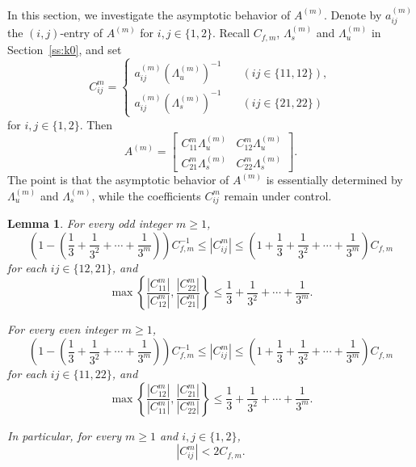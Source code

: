 \documentclass{amsart}
\theoremstyle{plain}
\newtheorem{lem}[thm]{Lemma}
\theoremstyle{definition}
\theoremstyle{remark}
\numberwithin{equation}{section}
\begin{document}
In this section, we investigate the asymptotic behavior of $A^{(m)}$.
Denote by $a_{ij}^{(m)}$ the $(i,j)$-entry of $A^{(m)}$ for $i,j\in\{1,2\}$.
Recall $C_{f,m}$, $\Lambda_{s}^{(m)}$ and $\Lambda_{u}^{(m)}$ in Section~\ref{ss:k0}, and set
\[
C_{ij}^m=
\begin{cases}
a^{(m)}_{ij}(\Lambda_{u}^{(m)})^{-1} \quad &(\text{$ij\in \{11,12\}$}),\\[2mm]
a^{(m)}_{ij}(\Lambda_{s}^{(m)})^{-1} \quad &(\text{$ij\in \{21,22\}$})
\end{cases}
\]
for $i,j \in \{1,2\}$.
Then
\[
A^{(m)}=
\begin{bmatrix}
C_{11}^m \Lambda_{u}^{(m)} & C_{12}^m \Lambda_{u}^{(m)}\\
C_{21}^m \Lambda_{s}^{(m)} & C_{22}^m \Lambda_{s}^{(m)}
\end{bmatrix}.
\]
The point is that the asymptotic behavior of $A^{(m)}$ is essentially determined by
$\Lambda_{u}^{(m)}$ and $\Lambda_{s}^{(m)}$, while the coefficients $C_{ij}^m$ remain under control.


\begin{lem}\label{lem:250404a}
For every odd integer $m\ge 1$, 
\begin{equation}\label{eq:1221-odd}
\left(1-\left(\frac{1}{3}+\frac{1}{3^2}+\cdots +\frac{1}{3^{m}}\right)\right)C_{f,m}^{-1}
\le |C_{ij}^m|
\le
\left(1+\frac{1}{3}+\frac{1}{3^2}+\cdots +\frac{1}{3^{m}}\right)C_{f,m}
\end{equation}
for each $ij\in\{12,21\}$, and
\begin{equation}\label{eq:1221-odd-ratio}
\max\left\{
\frac{|C_{11}^m|}{|C_{12}^m|},
\frac{|C_{22}^m|}{|C_{21}^m|}
\right\}
\le
\frac{1}{3}+\frac{1}{3^2}+\cdots +\frac{1}{3^{m}}.
\end{equation}

For every even integer $m\ge 1$, 
\begin{equation}\label{eq:1221-even}
\left(1-\left(\frac{1}{3}+\frac{1}{3^2}+\cdots +\frac{1}{3^{m}}\right)\right)C_{f,m}^{-1}
\le |C_{ij}^m|
\le
\left(1+\frac{1}{3}+\frac{1}{3^2}+\cdots +\frac{1}{3^{m}}\right)C_{f,m}
\end{equation}
for each $ij\in\{11,22\}$, and
\begin{equation}\label{eq:1221-even-ratio}
\max\left\{
\frac{|C_{12}^m|}{|C_{11}^m|},
\frac{|C_{21}^m|}{|C_{22}^m|}
\right\}
\le
\frac{1}{3}+\frac{1}{3^2}+\cdots +\frac{1}{3^{m}}.
\end{equation}

In particular, for every $m\ge 1$ and $i,j\in\{1,2\}$,
\[
|C_{ij}^m|<2C_{f,m}.
\]
\end{lem}
\end{document}
